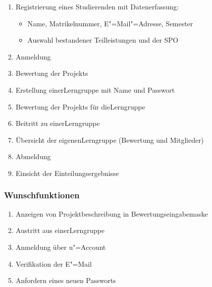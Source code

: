 \documentclass[parskip=full]{scrartcl}
\newcommand{\swtLabel}[1]{\textbf{/#1\arabic*0/}}
\begin{document}
\begin{enumerate}[label=\swtLabel{FA}]
  \item Registrierung eines Studierenden mit Datenerfassung:
  \label{FAregistrierung}
  \begin{itemize}
    \item Name, Matrikelnummer, E"=Mail"=Adresse, Semester %
    \item Auswahl bestandener Teilleistungen und der \gls{SPO}
  \end{itemize}
  \item Anmeldung \label{FAStudanmeldung}
  \item Bewertung der \glspl{Projekt} \label{FAbewertung}
  \item Erstellung einer\gls{Lerngruppe} mit Name und Passwort \label{FAcreatelerng}
  \item Bewertung der \glspl{Projekt} für die\gls{Lerngruppe}  \label{FAbewertung2}
  \item Beitritt zu einer\gls{Lerngruppe} \label{FAjoinLerng}
  \item Übersicht der eigenen\gls{Lerngruppe} (Bewertung und Mitglieder)
  \label{FAcheckLerng}
  \item Abmeldung \label{FAStudabmeldung}
  \item Einsicht der Einteilungsergebnisse \label{FAStudeinsicht}
\end{enumerate}

\subsubsection{Wunschfunktionen}

\begin{enumerate}[label=\swtLabel{FA}, resume]
	\item Anzeigen von Projektbeschreibung in Bewertungseingabemaske
	\label{FAbeschreibung-Bewertung}
	\item Austritt aus einer\gls{Lerngruppe} \label{FAlergAustritt}
	\item Anmeldung über u"=Account \label{FAstudUanmeldung}%
	\item Verifikation der E"=Mail \label{FAemailverifikation}%
	\item Anfordern eines neuen Passworts \label{FApasswortvergessen}
\end{enumerate}
\end{document}
